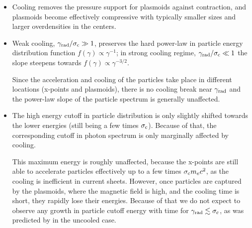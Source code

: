 \begin{itemize}[leftmargin=*,wide = 0pt]
  \item Cooling removes the pressure support for plasmoids against contraction, and plasmoids become effectively compressive with typically smaller sizes and larger overdensities in the centers.
\end{itemize}

\begin{itemize}[leftmargin=*,wide = 0pt]
  \item Weak cooling, $\gamma_{\rm rad}/\sigma_{\rm c}\gg 1$, preserves the hard power-law in particle energy distribution function $f(\gamma)\propto \gamma^{-1}$; in strong cooling regime, $\gamma_{\rm rad}/\sigma_{\rm c}\ll 1$ the slope steepens towards $f(\gamma)\propto \gamma^{-3/2}$.

  Since the acceleration and cooling of the particles take place in different locations (x-points and plasmoids), there is no cooling break near $\gamma_{\rm rad}$ and the power-law slope of the particle spectrum is generally unaffected.
\end{itemize}


\begin{itemize}[leftmargin=*,wide = 0pt]
    \item The high energy cutoff in particle distribution is only slightly shifted towards the lower energies (still being a few times $\sigma_{\rm c}$). Because of that, the corresponding cutoff in photon spectrum is only marginally affected by cooling.

    This maximum energy is roughly unaffected, because the x-points are still able to accelerate particles effectively up to a few times $\sigma_{\rm c} m_e c^2$, as the cooling is inefficient in current sheets. However, once particles are captured by the plasmoids, where the magnetic field is high, and the cooling time is short, they rapidly lose their energies. Because of that we do not expect to observe any growth in particle cutoff energy with time for $\gamma_{\rm rad}\lesssim\sigma_{\rm c}$, as was predicted by \cite{2018arXiv180800966P} in the uncooled case.
\end{itemize}


